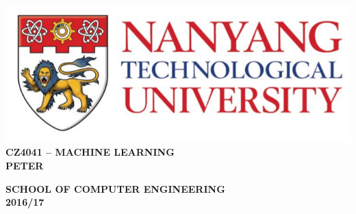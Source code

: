 \begin{titlepage}
	\begin{center}
		
		\includegraphics[width=1\textwidth]{./ntu_logo.png}
		\\[5cm]
		
		\uppercase{\textbf{CZ4041 -- MACHINE LEARNING}}
		\\[5cm]
		
		\uppercase{
			\textbf{
				PETER
		}}
		
		\vfill
		
		\textsc{\bfseries SCHOOL OF COMPUTER ENGINEERING}
		\\
		\textbf{2016/17}
		
	\end{center}
\end{titlepage}